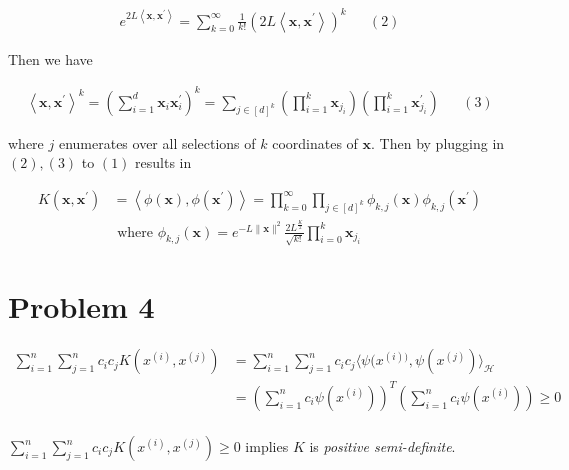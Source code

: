 \documentclass[13pt]{article}
\begin{document}
\begin{align*}
    e^{2L\left\langle\mathbf{x}, \mathbf{x}^{\prime}\right\rangle}=\sum_{k=0}^{\infty} \frac{1}{k !}\left(2L\left\langle\mathbf{x}, \mathbf{x}^{\prime}\right\rangle\right)^k && (2)
\end{align*}

Then we have 

\begin{align*}
    \left\langle\mathbf{x}, \mathbf{x}^{\prime}\right\rangle^k=\left(\sum_{i=1}^d \mathbf{x}_i \mathbf{x}_i^{\prime}\right)^k=\sum_{j \in[d]^k}\left(\prod_{i=1}^k \mathbf{x}_{j_i}\right)\left(\prod_{i=1}^k \mathbf{x}_{j_i}^{\prime}\right) && (3)
\end{align*}

where $j$ enumerates over all selections of $k$ coordinates of $\mathbf{x}$. Then by plugging in $(2), (3)$ to $(1)$ results in

\begin{align*}
    K\left(\mathbf{x}, \mathbf{x}^{\prime}\right)&=\left\langle\phi(\mathbf{x}), \phi\left(\mathbf{x}^{\prime}\right)\right\rangle=\prod_{k=0}^{\infty} \prod_{j \in[d]^k} \phi_{k, j}(\mathbf{x}) \phi_{k, j}\left(\mathbf{x}^{\prime}\right)\\
    &\text{ where }     \phi_{k, j}(\mathbf{x})=e^{-L\|\mathbf{x}\|^2} \frac{2L^{\frac{K}{2}}}{\sqrt{k !}} \prod_{i=0}^k \mathbf{x}_{j_i}
\end{align*}

\section{Problem 4}

\begin{align*}
\sum_{i=1}^n \sum_{j=1}^n c_i c_j K\left(x^{(i)}, x^{(j)}\right) &= \sum_{i=1}^n \sum_{j=1}^n c_i c_j \langle\psi(x^{(i))}, \psi(x^{(j)})\rangle_{\mathcal{H}}\\
&= \left(\sum_{i=1}^n c_i \psi(x^{(i)}) \right)^T\left(\sum_{i=1}^n c_i \psi(x^{(i)}) \right) \ge 0\\
\end{align*}

$\sum_{i=1}^n \sum_{j=1}^n c_i c_j K\left(x^{(i)}, x^{(j)}\right) \ge 0$ implies $K$ is \textit{positive semi-definite}.
\end{document}
